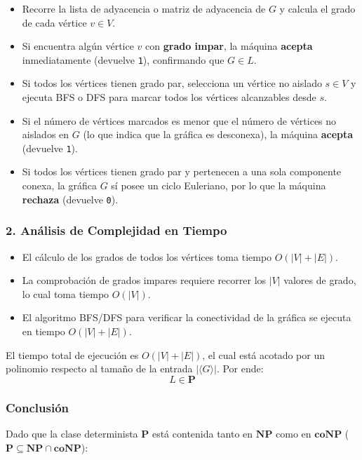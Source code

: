 \begin{itemize}[leftmargin=*]
    \begin{itemize}[leftmargin=*]
        \item Recorre la lista de adyacencia o matriz de adyacencia de $G$ y calcula el grado de cada vértice $v \in V$.
        \item Si encuentra algún vértice $v$ con \textbf{grado impar}, la máquina \textbf{acepta} inmediatamente (devuelve \texttt{1}), confirmando que $G \in L$.
        \item Si todos los vértices tienen grado par, selecciona un vértice no aislado $s \in V$ y ejecuta BFS o DFS para marcar todos los vértices alcanzables desde $s$.
        \item Si el número de vértices marcados es menor que el número de vértices no aislados en $G$ (lo que indica que la gráfica es desconexa), la máquina \textbf{acepta} (devuelve \texttt{1}).
        \item Si todos los vértices tienen grado par y pertenecen a una sola componente conexa, la gráfica $G$ sí posee un ciclo Euleriano, por lo que la máquina \textbf{rechaza} (devuelve \texttt{0}).
    \end{itemize}

    \subsubsection*{2. Análisis de Complejidad en Tiempo}

    \begin{itemize}[leftmargin=*]
        \item El cálculo de los grados de todos los vértices toma tiempo $O(|V| + |E|)$.
        \item La comprobación de grados impares requiere recorrer los $|V|$ valores de grado, lo cual toma tiempo $O(|V|)$.
        \item El algoritmo BFS/DFS para verificar la conectividad de la gráfica se ejecuta en tiempo $O(|V| + |E|)$.
    \end{itemize}

    El tiempo total de ejecución es $O(|V| + |E|)$, el cual está acotado por un polinomio respecto al tamaño de la entrada $|\langle G \rangle|$. Por ende:
    \[ L \in \mathbf{P} \]

    \subsubsection*{Conclusión}

    Dado que la clase determinista $\mathbf{P}$ está contenida tanto en $\mathbf{NP}$ como en $\mathbf{coNP}$ ($\mathbf{P} \subseteq \mathbf{NP} \cap \mathbf{coNP}$):


\end{itemize}
